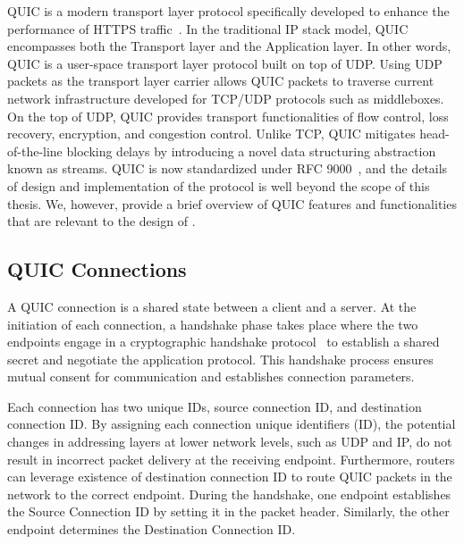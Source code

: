 
QUIC is a modern transport layer protocol specifically developed to enhance the performance of HTTPS traffic~\cite{langley2017quic}.
In the traditional IP stack model, QUIC encompasses both the Transport layer and the Application layer.
In other words, QUIC is a user-space transport layer protocol built on top of UDP. 
Using UDP packets as the transport layer carrier allows QUIC packets to traverse current network infrastructure developed for TCP/UDP protocols such as middleboxes.
On the top of UDP, QUIC provides transport functionalities of flow control, loss recovery, encryption, and congestion control.
Unlike TCP, QUIC mitigates head-of-the-line blocking delays by introducing a novel data structuring abstraction known as streams. 
QUIC is now standardized under RFC 9000~\cite{rfc9000}, and the details of design and implementation of the protocol is well beyond the scope of this thesis.
We, however, provide a brief overview of QUIC features and functionalities that are relevant to the design of {\sys}.




\subsection{QUIC Connections}
A QUIC connection is a shared state between a client and a server.
At the initiation of each connection, a handshake phase takes place where the two endpoints engage in a cryptographic handshake protocol~\cite{rfc9001} to establish a shared secret and negotiate the application protocol.
This handshake process ensures mutual consent for communication and establishes connection parameters.

Each connection has two unique IDs, source connection ID, and destination connection ID.
By assigning each connection unique identifiers (ID), the potential changes in addressing layers at lower network levels, such as UDP and IP, do not result in incorrect packet delivery at the receiving endpoint.
Furthermore, routers can leverage existence of destination connection ID to route QUIC packets in the network to the correct endpoint.
During the handshake, one endpoint establishes the Source Connection ID by setting it in the packet header.
Similarly, the other endpoint determines the Destination Connection ID.

